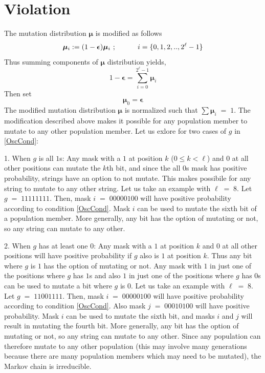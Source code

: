 \section{Violation}
The mutation distribution $\bm{\mu}$ is modified as follows
\[
\bm{\mu}_i := (1-\bm{\epsilon}) \bm{\mu}_i \hspace{0.01in}\;; \hspace{30pt} i = \{0, 1, 2,.., 2^{\ell}-1\}
\]
Thus summing components of $\bm{\mu}$ distribution yields, 
\[
1-\bm{\epsilon} = \sum \limits_{i=0}^{2^{\ell}-1} \bm{\mu}_i
\]
Then set
\[
\bm{\mu}_0 = \bm{\epsilon}
\]
The modified mutation distribution $\bm{\mu}$ is normalized such that  $\sum \bm{\mu}_i \;=\; 1$.
The modification described above makes it possible for any population member to mutate to any other population member.
Let us exlore for two cases of $g$ in \ref{OscCond}:

1. When $g$ is all $1$s:\newline
Any mask with a $1$ at position $k$ ($0 \leq k < \ell$) and $0$ at all other positions can mutate the $k$th bit, and since the 
all $0$s mask has positive probability, strings have an option to not mutate. This makes possibile for any string to mutate to 
any other string. Let us take an example with $\ell \;=\; 8$. Let $g \;=\; 11111111$. Then, mask 
$i \;=\; 00000100$ will have positive probability according to condition \ref{OscCond}. 
Mask $i$ can be used to mutate the sixth bit of a population member. More generally, 
any bit has the option of mutating or not, so any string can mutate to any other.

2. When $g$ has at least one $0$:\newline
Any mask with a $1$ at position $k$ and $0$ at all other positions  
will have positive probability if $g$ also is $1$ at position $k$. Thus any bit where $g$ is $1$ has the option of mutating or not.  
Any mask with $1$ in just one of the positions where $g$ has $1$s and also $1$ in just one of the positions where $g$ has $0$s can be used to 
mutate a bit where $g$ is $0$. Let us take an example with $\ell \;=\; 8$. Let $g \;=\; 11001111$. Then, 
mask $i \;=\; 00000100$ will have positive probability according to condition \ref{OscCond}. Also mask 
$j \;=\; 00010100$ will have positive probability. Mask $i$ can be used to mutate the sixth bit, and masks $i$ and $j$ will result in mutating
the fourth bit. More generally, any bit has the option of mutating or not, so any string can mutate to any other. Since any population can therefore 
mutate to any other population (this may involve many generations because there are many population members which may need to be mutated), the Markov 
chain is irreducible.

